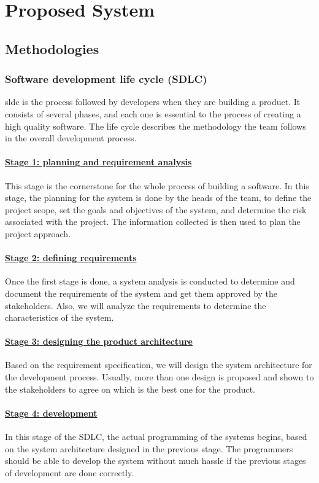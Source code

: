 \documentclass[../main.tex]{subfiles}
\begin{document}
\chapter{Proposed System}
\section{Methodologies}
\subsection{Software development life cycle (SDLC)}
\acrfull{sldc} is the process followed by developers when they are building a product. It consists of several phases, and each one is essential to the process of creating a high quality software. The life cycle describes the methodology the team follows in the overall development process. 
\subsubsection*{\underline{Stage 1: planning and requirement analysis
}}
This stage is the cornerstone for the whole process of building a software. In this stage, the planning for the system is done by the heads of the team, to define the project scope, set the goals and objectives of the system, and determine the risk associated with the project. The information collected is then used to plan the project approach. 
\subsubsection*{\underline{Stage 2: defining requirements
}} 
Once the first stage is done, a system analysis is conducted to determine and document the requirements of the system and get them approved by the stakeholders. Also, we will analyze the requirements to determine the characteristics of the system. 
\subsubsection*{\underline{Stage 3: designing the product architecture 
}} 
Based on the requirement specification, we will design the system architecture for the development process. Usually, more than one design is proposed and shown to the stakeholders to agree on which is the best one for the product. 
\subsubsection*{\underline{Stage 4: development
}}  
In this stage of the SDLC, the actual programming of the systems begins, based on the system architecture designed in the previous stage. The programmers should be able to develop the system without much hassle if the previous stages of development are done correctly. 
\end{document}
